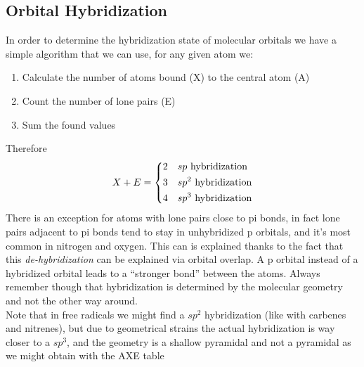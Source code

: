 \documentclass[../qm.tex]{subfiles}
\begin{document}
\subsection{Orbital Hybridization}
In order to determine the hybridization state of molecular orbitals we have a simple algorithm that we can use, for any given atom we:
\begin{enumerate}
\item Calculate the number of atoms bound (X) to the central atom (A)
\item Count the number of lone pairs (E)
\item Sum the found values
\end{enumerate}
Therefore
\begin{equation*}
	X+E=\begin{dcases}
		2&sp\ \text{hybridization}\\
		3&sp^2\ \text{hybridization}\\
		4&sp^3\ \text{hybridization}
	\end{dcases}
\end{equation*}
There is an exception for atoms with lone pairs close to pi bonds, in fact lone pairs adjacent to pi bonds tend to stay in unhybridized p orbitals, and it's most common in nitrogen and oxygen. This can is explained thanks to the fact that this \emph{de-hybridization} can be explained via orbital overlap. A p orbital instead of a hybridized orbital leads to a ``stronger bond'' between the atoms. Always remember though that hybridization is determined by the molecular geometry and not the other way around.\\
Note that in free radicals we might find a $sp^2$ hybridization (like with carbenes and nitrenes), but due to geometrical strains the actual hybridization is way closer to a $sp^3$, and the geometry is a shallow pyramidal and not a pyramidal as we might obtain with the AXE table
\end{document}

